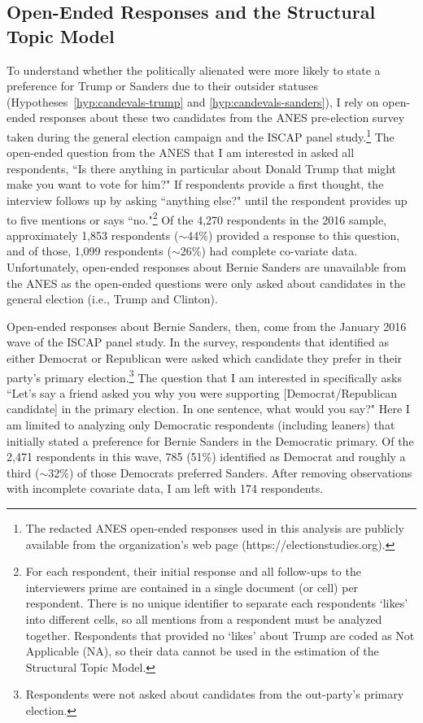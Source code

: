 \documentclass[12pt]{article}
\begin{document}
\subsection{Open-Ended Responses and the Structural Topic Model}
To understand whether the politically alienated were more likely to state a preference for Trump or Sanders due to their outsider statuses (Hypotheses~\ref{hyp:candevals-trump} and \ref{hyp:candevals-sanders}), I rely on open-ended responses about these two candidates from the ANES pre-election survey taken during the general election campaign and the ISCAP panel study.\footnote{The redacted ANES open-ended responses used in this analysis are publicly available from the organization's web page (https://electionstudies.org).} The open-ended question from the ANES that I am interested in asked all respondents, ``Is there anything in particular about Donald Trump that might make you want to vote for him?" If respondents provide a first thought, the interview follows up by asking ``anything else?" until the respondent provides up to five mentions or says ``no."\footnote{For each respondent, their initial response and all follow-ups to the interviewers prime are contained in a single document (or cell) per respondent. There is no unique identifier to separate each respondents `likes' into different cells, so all mentions from a respondent must be analyzed together. Respondents that provided no `likes' about Trump are coded as Not Applicable (NA), so their data cannot be used in the estimation of the Structural Topic Model.} Of the 4,270 respondents in the 2016 sample, approximately 1,853 respondents ($\sim$44\%) provided a response to this question, and of those, 1,099 respondents ($\sim$26\%) had complete co-variate data. Unfortunately, open-ended responses about Bernie Sanders are unavailable from the ANES as the open-ended questions were only asked about candidates in the general election (i.e., Trump and Clinton). 

Open-ended responses about Bernie Sanders, then, come from the January 2016 wave of the ISCAP panel study. In the survey, respondents that identified as either Democrat or Republican were asked which candidate they prefer in their party's primary election.\footnote{Respondents were not asked about candidates from the out-party's primary election.} The question that I am interested in specifically asks ``Let's say a friend asked you why you were supporting [Democrat/Republican candidate] in the primary election. In one sentence, what would you say?" Here I am limited to analyzing only Democratic respondents (including leaners) that initially stated a preference for Bernie Sanders in the Democratic primary. Of the 2,471 respondents in this wave, 785 (51\%) identified as Democrat and roughly a third ($\sim$32\%) of those Democrats preferred Sanders. After removing observations with incomplete covariate data, I am left with 174 respondents. 
\end{document}
